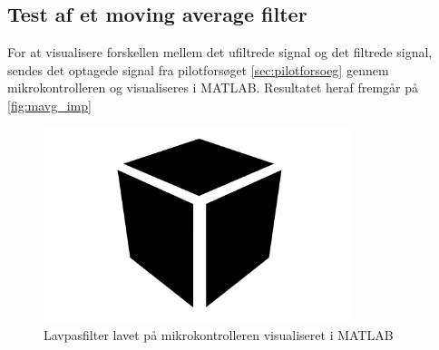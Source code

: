 \subsection{Test af et moving average filter}
For at visualisere forskellen mellem det ufiltrede signal og det filtrede signal, sendes det optagede signal fra pilotforsøget \autoref{sec:pilotforsoeg} gennem mikrokontrolleren og visualiseres i MATLAB. Resultatet heraf fremgår på \autoref{fig:mavg_imp}


\begin{figure}[H]
\centering
\includegraphics[width=0.8\textwidth]{figures/Pilotforsoeg/blackbox}
\caption{Lavpasfilter lavet på mikrokontrolleren visualiseret i MATLAB}
\label{fig:mavg_imp}
\end{figure}
 